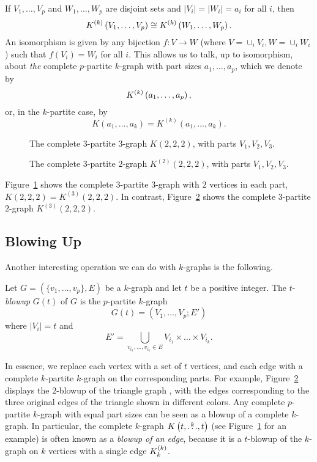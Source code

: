 If $V_1, \dots, V_p$ and $W_1, \dots, W_p$ are disjoint sets
and $|V_i| = |W_i| = a_i$ for all $i$, then
\[
    K^{(k)}\left(V_1, \dots, V_p\right) \cong K^{(k)}\left(W_1, \dots, W_p\right).
\]
An isomorphism is given by any bijection $f: V \to W$ (where $V=\cup_i V_i, W=\cup_i W_i$)
such that $f(V_i) = W_i$ for all $i$.
This allows us to talk, up to isomorphism, about \emph{the} complete $p$-partite $k$-graph
with part sizes $a_1, \dots, a_p$, which we denote by
\[
    K^{(k)}\left(a_1, \dots, a_p\right),
\]
or, in the $k$-partite case, by
\[
    K(a_1, \dots, a_k) = K^{(k)}(a_1, \dots, a_k).
\]

\begin{figure}[htbp]
    \centering
    
    \caption{The complete 3-partite 3-graph $K(2, 2, 2)$, with parts $V_1, V_2, V_3$.}
    \label{fig:222}
\end{figure}

\begin{figure}[htbp]
    \centering
    
    \caption{The complete 3-partite 2-graph $K^{(2)}(2, 2, 2)$, with parts $V_1, V_2, V_3$.}
    \label{fig:k2_222}
\end{figure}

Figure~\ref{fig:222} shows the complete $3$-partite $3$-graph
with $2$ vertices in each part, $K(2, 2, 2) = K^{(3)}(2, 2, 2)$.
In contrast, Figure~\ref{fig:k2_222} shows the complete $3$-partite $2$-graph
$K^{(3)}(2, 2, 2)$.

\subsection{Blowing Up} \label{subsec:blowup}

Another interesting operation we can do with $k$-graphs is the following.

\begin{definition}
    Let $G = (\{v_1, \dots, v_p\}, E)$ be a $k$-graph and let $t$ be a positive integer.
    The $t$-\emph{blowup} $G(t)$ of $G$ is the $p$-partite $k$-graph
    \[
        G(t) = (V_1, \dots, V_p; E')
    \]
    where $|V_i| = t$ and
    \[
        E' = \bigcup_{v_{i_1}, \dots, v_{i_k} \in E} V_{i_1} \times \dots \times V_{i_k}.
    \]
\end{definition}

In essence, we replace each vertex with a set of $t$ vertices, and each edge with a complete $k$-partite $k$-graph
on the corresponding parts.
For example, Figure~\ref{fig:k2_222} displays the $2$-blowup of the triangle graph ,
with the edges corresponding to the three original edges of the triangle shown in different colors.
Any complete $p$-partite $k$-graph with equal part sizes can be seen as a blowup of a complete $k$-graph.
In particular, the complete $k$-graph $K\left(t, \overset{k}{\dots}, t\right)$ (see Figure~\ref{fig:222} for an example)
is often known as a \emph{blowup of an edge}, because it is a $t$-blowup of the
$k$-graph on $k$ vertices with a single edge $K^{(k)}_{k}$.

